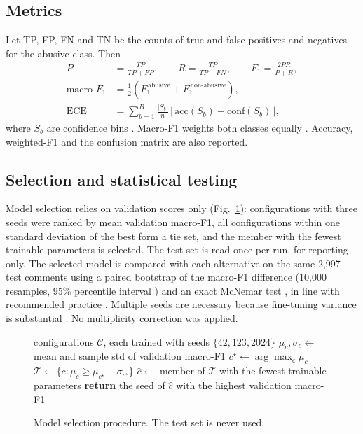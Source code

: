 \documentclass[conference]{IEEEtran}
\begin{document}
\subsection{Metrics}
Let TP, FP, FN and TN be the counts of true and false positives and negatives for the abusive class. Then
\begin{align}
P &= \frac{TP}{TP+FP}, \qquad R = \frac{TP}{TP+FN}, \qquad F_1 = \frac{2PR}{P+R},\\
\text{macro-}F_1 &= \tfrac{1}{2}\left(F_1^{\,\text{abusive}} + F_1^{\,\text{non-abusive}}\right),\\
\text{ECE} &= \sum_{b=1}^{B}\frac{|S_b|}{n}\,\bigl|\,\mathrm{acc}(S_b)-\mathrm{conf}(S_b)\,\bigr|,
\end{align}
where $S_b$ are confidence bins \cite{guo2017calibration}. Macro-F1 weights both classes equally \cite{sokolova2009}. Accuracy, weighted-F1 and the confusion matrix are also reported.

\subsection{Selection and statistical testing}
Model selection relies on validation scores only (Fig.~\ref{alg:select}): configurations with three seeds were ranked by mean validation macro-F1, all configurations within one standard deviation of the best form a tie set, and the member with the fewest trainable parameters is selected. The test set is read once per run, for reporting only. The selected model is compared with each alternative on the same 2,997 test comments using a paired bootstrap of the macro-F1 difference (10,000 resamples, 95\% percentile interval \cite{efron1993bootstrap}) and an exact McNemar test \cite{mcnemar1947}, in line with recommended practice \cite{dror2018}. Multiple seeds are necessary because fine-tuning variance is substantial \cite{dodge2020}. No multiplicity correction was applied.

\begin{figure}[t]
\footnotesize
\begin{algorithmic}[1]
\REQUIRE configurations $\mathcal{C}$, each trained with seeds $\{42,123,2024\}$
  \STATE $\mu_c, \sigma_c \leftarrow$ mean and sample std of validation macro-F1
\ENDFOR
\STATE $c^\star \leftarrow \arg\max_c \mu_c$
\STATE $\mathcal{T} \leftarrow \{c : \mu_c \ge \mu_{c^\star} - \sigma_{c^\star}\}$ 
\STATE $\hat{c} \leftarrow$ member of $\mathcal{T}$ with the fewest trainable parameters
\STATE \textbf{return} the seed of $\hat{c}$ with the highest validation macro-F1
\end{algorithmic}
\caption{Model selection procedure. The test set is never used.}
\label{alg:select}
\end{figure}
\end{document}
